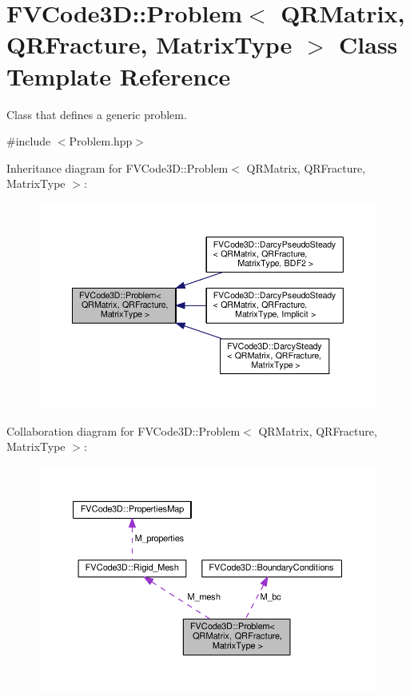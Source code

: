 \hypertarget{classFVCode3D_1_1Problem}{}\section{F\+V\+Code3D\+:\+:Problem$<$ Q\+R\+Matrix, Q\+R\+Fracture, Matrix\+Type $>$ Class Template Reference}
\label{classFVCode3D_1_1Problem}


Class that defines a generic problem.  




{\ttfamily \#include $<$Problem.\+hpp$>$}



Inheritance diagram for F\+V\+Code3D\+:\+:Problem$<$ Q\+R\+Matrix, Q\+R\+Fracture, Matrix\+Type $>$\+:
\nopagebreak
\begin{figure}[H]
\begin{center}
\leavevmode
\includegraphics[width=350pt]{classFVCode3D_1_1Problem__inherit__graph}
\end{center}
\end{figure}


Collaboration diagram for F\+V\+Code3D\+:\+:Problem$<$ Q\+R\+Matrix, Q\+R\+Fracture, Matrix\+Type $>$\+:
\nopagebreak
\begin{figure}[H]
\begin{center}
\leavevmode
\includegraphics[width=350pt]{classFVCode3D_1_1Problem__coll__graph}
\end{center}
\end{figure}
